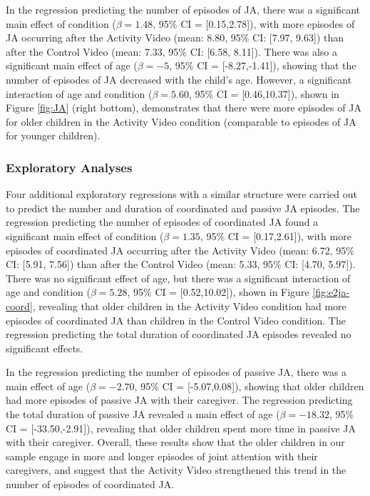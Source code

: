 \documentclass[man,floatsintext]{apa6}
\begin{document}
In the regression predicting the number of episodes of JA, there was a significant main effect of condition (\(\beta=1.48\), 95\% CI = {[}0.15,2.78{]}), with more episodes of JA occurring after the Activity Video (mean: 8.80, 95\% CI: {[}7.97, 9.63{]}) than after the Control Video (mean: 7.33, 95\% CI: {[}6.58, 8.11{]}).
There was also a significant main effect of age (\(\beta=-5\), 95\% CI = {[}-8.27,-1.41{]}), showing that the number of episodes of JA decreased with the child's age.
However, a significant interaction of age and condition (\(\beta=5.60\), 95\% CI = {[}0.46,10.37{]}), shown in Figure \ref{fig:JA} (right bottom), demonstrates that there were more episodes of JA for older children in the Activity Video condition (comparable to episodes of JA for younger children).

\hypertarget{exploratory-analyses-1}{%
\subsubsection{Exploratory Analyses}\label{exploratory-analyses-1}}

Four additional exploratory regressions with a similar structure were carried out to predict the number and duration of coordinated and passive JA episodes.
The regression predicting the number of episodes of coordinated JA found a significant main effect of condition (\(\beta=1.35\), 95\% CI = {[}0.17,2.61{]}), with more episodes of coordinated JA occurring after the Activity Video (mean: 6.72, 95\% CI: {[}5.91, 7.56{]}) than after the Control Video (mean: 5.33, 95\% CI: {[}4.70, 5.97{]}).
There was no significant effect of age, but there was a significant interaction of age and condition (\(\beta=5.28\), 95\% CI = {[}0.52,10.02{]}), shown in Figure \ref{fig:e2ja-coord}, revealing that older children in the Activity Video condition had more episodes of coordinated JA than children in the Control Video condition.
The regression predicting the total duration of coordinated JA episodes revealed no significant effects.

In the regression predicting the number of episodes of passive JA, there was a main effect of age (\(\beta=-2.70\), 95\% CI = {[}-5.07,0.08{]}), showing that older children had more episodes of passive JA with their caregiver.
The regression predicting the total duration of passive JA revealed a main effect of age (\(\beta=-18.32\), 95\% CI = {[}-33.50,-2.91{]}), revealing that older children spent more time in passive JA with their caregiver.
Overall, these results show that the older children in our sample engage in more and longer episodes of joint attention with their caregivers, and suggest that the Activity Video strengthened this trend in the number of episodes of coordinated JA.
\end{document}
